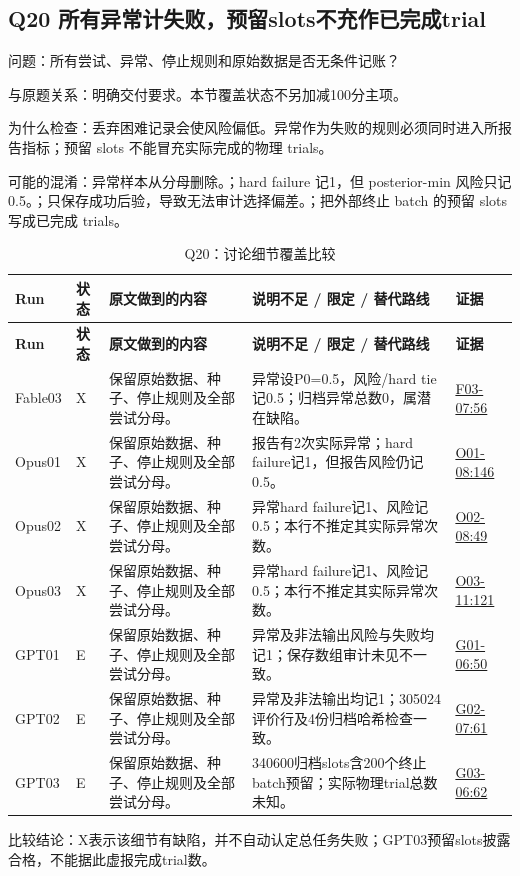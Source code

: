 \documentclass[11pt,a4paper]{article}
\begin{document}
\clearpage
\subsection{Q20 所有异常计失败，预留slots不充作已完成trial}
\label{aspect:Q20}
问题：所有尝试、异常、停止规则和原始数据是否无条件记账？

与原题关系：明确交付要求。本节覆盖状态不另加减100分主项。

为什么检查：丢弃困难记录会使风险偏低。异常作为失败的规则必须同时进入所报告指标；预留 slots 不能冒充实际完成的物理 trials。

可能的混淆：异常样本从分母删除。；hard failure 记1，但 posterior-min 风险只记0.5。；只保存成功后验，导致无法审计选择偏差。；把外部终止 batch 的预留 slots 写成已完成 trials。

{\fontsize{9.0}{12.6}\selectfont
\setlength{\tabcolsep}{2.5pt}
\begin{longtable}{>{\raggedright\arraybackslash}p{}>{\raggedright\arraybackslash}p{}>{\raggedright\arraybackslash}p{}>{\raggedright\arraybackslash}p{}>{\raggedright\arraybackslash}p{}}
\caption{Q20：讨论细节覆盖比较}\\
\toprule
\textbf{Run} & \textbf{状态} & \textbf{原文做到的内容} & \textbf{说明不足 / 限定 / 替代路线} & \textbf{证据}\tabularnewline
\midrule
\endfirsthead
\toprule
\textbf{Run} & \textbf{状态} & \textbf{原文做到的内容} & \textbf{说明不足 / 限定 / 替代路线} & \textbf{证据}\tabularnewline
\midrule
\endhead
{}Fable03 & X & 保留原始数据、种子、停止规则及全部尝试分母。 & 异常设P0=0.5，风险/hard tie记0.5；归档异常总数0，属潜在缺陷。 & \hyperref[src:F03-07]{F03-07:56}\tabularnewline
{}Opus01 & X & 保留原始数据、种子、停止规则及全部尝试分母。 & 报告有2次实际异常；hard failure记1，但报告风险仍记0.5。 & \hyperref[src:O01-08]{O01-08:146}\tabularnewline
{}Opus02 & X & 保留原始数据、种子、停止规则及全部尝试分母。 & 异常hard failure记1、风险记0.5；本行不推定其实际异常次数。 & \hyperref[src:O02-08]{O02-08:49}\tabularnewline
{}Opus03 & X & 保留原始数据、种子、停止规则及全部尝试分母。 & 异常hard failure记1、风险记0.5；本行不推定其实际异常次数。 & \hyperref[src:O03-11]{O03-11:121}\tabularnewline
{}GPT01 & E & 保留原始数据、种子、停止规则及全部尝试分母。 & 异常及非法输出风险与失败均记1；保存数组审计未见不一致。 & \hyperref[src:G01-06]{G01-06:50}\tabularnewline
{}GPT02 & E & 保留原始数据、种子、停止规则及全部尝试分母。 & 异常及非法输出均记1；305024评价行及4份归档哈希检查一致。 & \hyperref[src:G02-07]{G02-07:61}\tabularnewline
{}GPT03 & E & 保留原始数据、种子、停止规则及全部尝试分母。 & 340600归档slots含200个终止batch预留；实际物理trial总数未知。 & \hyperref[src:G03-06]{G03-06:62}\tabularnewline
\bottomrule
\end{longtable}
}
比较结论：X表示该细节有缺陷，并不自动认定总任务失败；GPT03预留slots披露合格，不能据此虚报完成trial数。
\end{document}
